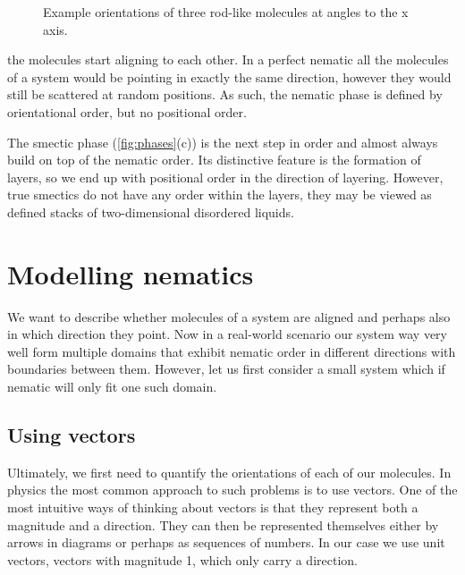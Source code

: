 \documentclass[a4paper,11pt]{article}
\begin{document}
\begin{multicols}{2}
\begin{figure}[th]
        \caption{
            Example orientations of three rod-like molecules at angles to the x axis.
        }\label{fig:mols}
    \end{figure}
    the molecules start aligning to each other.
    In a perfect nematic all the molecules of a system would be pointing in exactly the same direction, however they would still be scattered at random positions.
    As such, the nematic phase is defined by orientational order, but no positional order.

    The smectic phase (\cref{fig:phases}(c)) is the next step in order and almost always build on top of the nematic order.
    Its distinctive feature is the formation of layers, so we end up with positional order in the direction of layering.
    However, true smectics do not have any order within the layers, they may be viewed as defined stacks of two-dimensional disordered liquids.

    
    \section*{Modelling nematics}
    We want to describe whether molecules of a system are aligned and perhaps also in which direction they point.
    Now in a real-world scenario our system way very well form multiple domains that exhibit nematic order in different directions with boundaries between them.
    However, let us first consider a small system which if nematic will only fit one such domain.

    \subsection*{Using vectors}
    Ultimately, we first need to quantify the orientations of each of our molecules.
    In physics the most common approach to such problems is to use vectors.
    One of the most intuitive ways of thinking about vectors is that they represent both a magnitude and a direction.
    They can then be represented themselves either by arrows in diagrams or perhaps as sequences of numbers.
    In our case we use unit vectors, vectors with magnitude 1, which only carry a direction.


\end{multicols}
\end{document}
